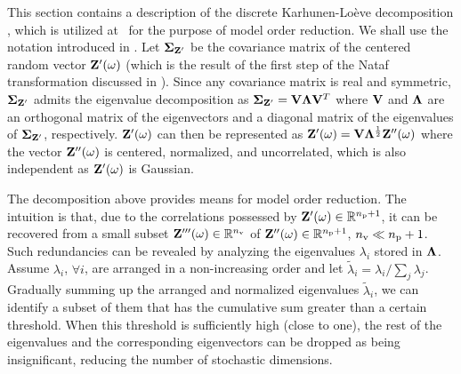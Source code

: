 This section contains a description of the discrete Karhunen-Lo\`{e}ve decomposition \cite{ghanem1991}, which is utilized at \ for the purpose of model order reduction.
We shall use the notation introduced in .
Let $\mCov_{\vZ'}$ be the covariance matrix of the centered random vector $\mathbf{Z}'(\omega)$ (which is the result of the first step of the Nataf transformation discussed in ).
Since any covariance matrix is real and symmetric, $\mCov_{\vZ'}$ admits the eigenvalue decomposition \cite{press2007} as $\mCov_{\vZ'} = \m{V} \m{\Lambda} \m{V}^T$ where $\m{V}$ and $\m{\Lambda}$ are an orthogonal matrix of the eigenvectors and a diagonal matrix of the eigenvalues of $\mCov_{\vZ'}$, respectively.
$\mathbf{Z}'(\omega)$ can then be represented as $\vZ'(\o) = \m{V} \m{\Lambda}^\frac{1}{2} \vZ''(\o)$ where the vector $\mathbf{Z}''(\omega)$ is centered, normalized, and uncorrelated, which is also independent as $\mathbf{Z}'(\omega)$ is Gaussian.

The decomposition above provides means for model order reduction.
The intuition is that, due to the correlations possessed by $\mathbf{Z}'(\omega) \in \mathbb{R}^{{n_\text{p}} + 1}$, it can be recovered from a small subset $\mathbf{Z}'''(\omega) \in \mathbb{R}^{n_\text{v}}$ of $\mathbf{Z}''(\omega) \in \mathbb{R}^{{n_\text{p}} + 1}$, ${n_\text{v}} \ll {n_\text{p}} + 1$.
Such redundancies can be revealed by analyzing the eigenvalues $\lambda_i$ stored in $\m{\Lambda}$.
Assume $\lambda_i$, $\forall i$, are arranged in a non-increasing order and let $\tilde{\lambda}_i = \lambda_i / \sum_j \lambda_j$.
Gradually summing up the arranged and normalized eigenvalues $\tilde{\lambda}_i$, we can identify a subset of them that has the cumulative sum greater than a certain threshold.
When this threshold is sufficiently high (close to one), the rest of the eigenvalues and the corresponding eigenvectors can be dropped as being insignificant, reducing the number of stochastic dimensions.
